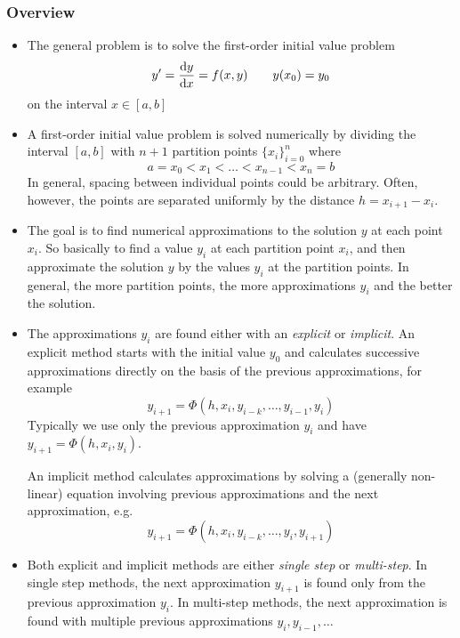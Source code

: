 \documentclass[11pt, a4paper]{article}
\begin{document}
\subsubsection{Overview}
\begin{itemize}
	\item The general problem is to solve the first-order initial value problem 
	\begin{equation*}
		y' = \dv{y}{x} = f(x, y) \qquad y(x_{0}) = y_{0}
	\end{equation*}
	on the interval $ x \in [a, b] $
	
	\item A first-order initial value problem is solved numerically by dividing the interval $ [a, b] $ with $ n+1 $ partition points $ \{x_{i}\}_{i=0}^{n} $ where
	\begin{equation*}
		a = x_0 < x_1 < \dots < x_{n-1} < x_{n} = b
	\end{equation*}
	In general, spacing between individual points could be arbitrary. Often, however, the points are separated uniformly by the distance $ h = x_{i+1} - x_{i} $.	
	
	\item  The goal is to find numerical approximations to the solution $ y $ at each point $ x_{i} $. So basically to find a value $ y_{i} $ at each partition point $ x_{i} $, and then approximate the solution $ y $ by the values $ y_{i} $ at the partition points. In general, the more partition points, the more approximations $ y_{i} $ and the better the solution.
			
	\item The approximations $ y_{i} $ are found either with an \textit{explicit} or \textit{implicit}. An explicit method starts with the initial value $ y_{0} $ and calculates successive approximations directly on the basis of the previous approximations, for example
	\begin{equation*}
		y_{i+1} = \Phi(h, x_{i}, y_{i-k}, \ldots, y_{i-1}, y_{i})
	\end{equation*}
	Typically we use only the previous approximation $ y_{i} $ and have $ y_{i+1} = \Phi(h, x_{i}, y_{i}) $.
	
	
	 An implicit method calculates approximations by solving a (generally non-linear) equation involving previous approximations and the next approximation, e.g.
 	\begin{equation*}
 		y_{i+1} = \Phi(h, x_{i}, y_{i-k}, \ldots, y_{i}, y_{i+1})
 	\end{equation*}
	
	\item Both explicit and implicit methods are either \textit{single step} or \textit{multi-step}. In single step methods, the next approximation $ y_{i+1} $ is found only from the previous approximation $ y_{i} $. In multi-step methods, the next approximation is found with multiple previous approximations $ y_{i}, y_{i-1}, \ldots $
	
\end{itemize}
\end{document}
